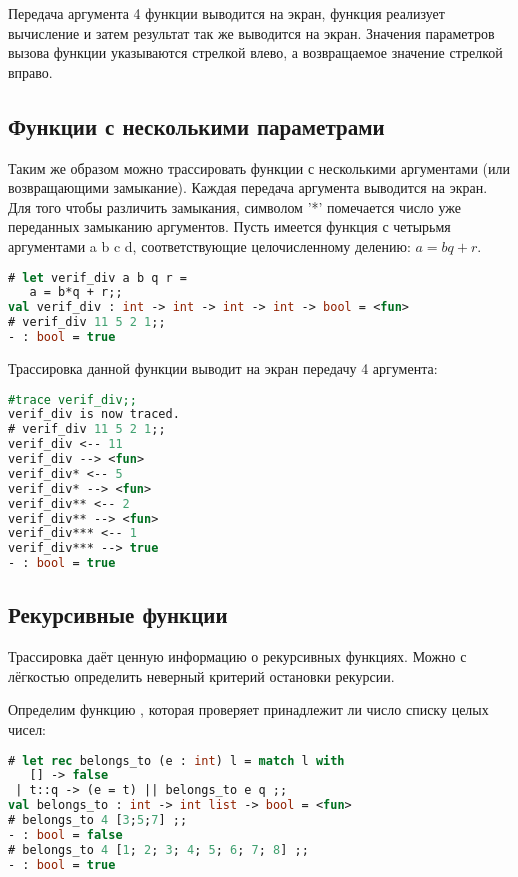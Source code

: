 Передача аргумента 4 функции  выводится на экран, функция реализует 
вычисление и затем результат так же выводится на экран. Значения параметров 
вызова функции указываются стрелкой влево, а возвращаемое значение стрелкой 
вправо.

\subsection {Функции с несколькими параметрами}
\label{subsubsec:functions_of_several_arguments}

Таким же образом можно трассировать функции с несколькими аргументами (или 
возвращающими замыкание). Каждая передача аргумента выводится на экран. Для того 
чтобы различить замыкания, символом '*' помечается число уже переданных 
замыканию аргументов. Пусть имеется функция  с четырьмя 
аргументами a b c d, соответствующие целочисленному делению: $a = bq + r$.

\begin{lstlisting}[language=OCaml]
# let verif_div a b q r = 
   a = b*q + r;;
val verif_div : int -> int -> int -> int -> bool = <fun>
# verif_div 11 5 2 1;;
- : bool = true
\end{lstlisting}

Трассировка данной функции выводит на экран передачу 4 аргумента:

\begin{lstlisting}[language=OCaml]
#trace verif_div;;
verif_div is now traced.
# verif_div 11 5 2 1;;
verif_div <-- 11
verif_div --> <fun>
verif_div* <-- 5
verif_div* --> <fun>
verif_div** <-- 2
verif_div** --> <fun>
verif_div*** <-- 1
verif_div*** --> true
- : bool = true
\end{lstlisting}

\subsection {Рекурсивные функции}
\label{subsubsec:recursive_functions}

Трассировка даёт ценную информацию о рекурсивных функциях. Можно с лёгкостью 
определить неверный критерий остановки рекурсии.

Определим функцию , которая проверяет принадлежит ли число 
списку целых чисел:

\begin{lstlisting}[language=OCaml]
# let rec belongs_to (e : int) l = match l with 
   [] -> false
 | t::q -> (e = t) || belongs_to e q ;;
val belongs_to : int -> int list -> bool = <fun>
# belongs_to 4 [3;5;7] ;;
- : bool = false
# belongs_to 4 [1; 2; 3; 4; 5; 6; 7; 8] ;;
- : bool = true
\end{lstlisting}

